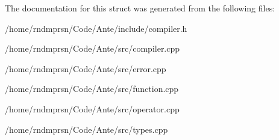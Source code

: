 The documentation for this struct was generated from the following files\+:\begin{DoxyCompactItemize}
\item 
/home/rndmprsn/\+Code/\+Ante/include/compiler.\+h\item 
/home/rndmprsn/\+Code/\+Ante/src/compiler.\+cpp\item 
/home/rndmprsn/\+Code/\+Ante/src/error.\+cpp\item 
/home/rndmprsn/\+Code/\+Ante/src/function.\+cpp\item 
/home/rndmprsn/\+Code/\+Ante/src/operator.\+cpp\item 
/home/rndmprsn/\+Code/\+Ante/src/types.\+cpp\end{DoxyCompactItemize}
